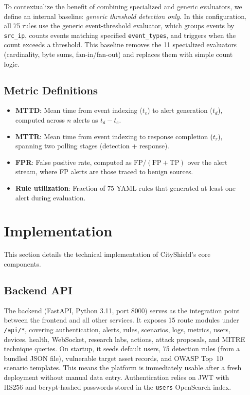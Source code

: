 \documentclass[conference,10pt]{IEEEtran}
\begin{document}
To contextualize the benefit of combining specialized and generic evaluators, we define an internal baseline: \emph{generic threshold detection only}. In this configuration, all 75 rules use the generic event-threshold evaluator, which groups events by \texttt{src\_ip}, counts events matching specified \texttt{event\_types}, and triggers when the count exceeds a threshold. This baseline removes the 11 specialized evaluators (cardinality, byte sums, fan-in/fan-out) and replaces them with simple count logic.

\subsection{Metric Definitions}

\begin{itemize}[leftmargin=*]
    \item \textbf{MTTD}: Mean time from event indexing ($t_e$) to alert generation ($t_d$), computed across $n$ alerts as $\overline{t_d - t_e}$.
    \item \textbf{MTTR}: Mean time from event indexing to response completion ($t_r$), spanning two polling stages (detection + response).
    \item \textbf{FPR}: False positive rate, computed as $\text{FP} / (\text{FP} + \text{TP})$ over the alert stream, where FP alerts are those traced to benign sources.
    \item \textbf{Rule utilization}: Fraction of 75 YAML rules that generated at least one alert during evaluation.
\end{itemize}

\section{Implementation}
\label{sec:implementation}

This section details the technical implementation of CityShield's core components.

\subsection{Backend API}

The backend (FastAPI, Python 3.11, port 8000) serves as the integration point between the frontend and all other services. It exposes 15 route modules under \texttt{/api/*}, covering authentication, alerts, rules, scenarios, logs, metrics, users, devices, health, WebSocket, research labs, actions, attack proposals, and MITRE technique queries. On startup, it seeds default users, 75 detection rules (from a bundled JSON file), vulnerable target asset records, and OWASP Top~10~\cite{owasp2021} scenario templates. This means the platform is immediately usable after a fresh deployment without manual data entry. Authentication relies on JWT with HS256 and bcrypt-hashed passwords stored in the \texttt{users} OpenSearch index.
\end{document}

